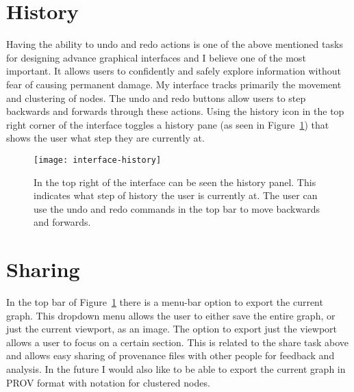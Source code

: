 \clearpage

\section{History}
\label{sec:history}

Having the ability to undo and redo actions is one of the above mentioned tasks for designing advance graphical interfaces and I believe one of the most important. It allows users to confidently and safely explore information without fear of causing permanent damage. My interface tracks primarily the movement and clustering of nodes. The undo and redo buttons allow users to step backwards and forwards through these actions. Using the history icon in the top right corner of the interface toggles a history pane (as seen in Figure~\ref{fig:interface-history}) that shows the user what step they are currently at. 

\begin{figure}[h]
	\centering
	\texttt{[image: interface-history]}
	\caption{In the top right of the interface can be seen the history panel. This indicates what step of history the user is currently at. The user can use the undo and redo commands in the top bar to move backwards and forwards.}
	\label{fig:interface-history}
\end{figure}

\section{Sharing}
\label{sec:sharing}

In the top bar of Figure~\ref{fig:interface-history} there is a menu-bar option to export the current graph. This dropdown menu allows the user to either save the entire graph, or just the current viewport, as an image. The option to export just the viewport allows a user to focus on a certain section. This is related to the share task above and allows easy sharing of provenance files with other people for feedback and analysis. In the future I would also like to be able to export the current graph in PROV format with notation for clustered nodes.
